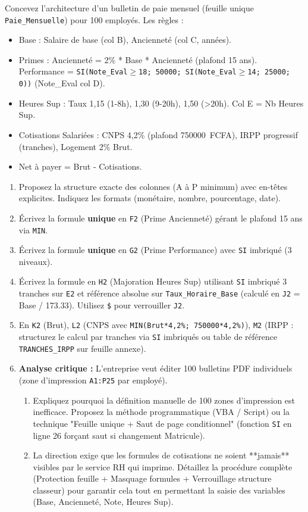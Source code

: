 \documentclass[11pt]{article}
\begin{document}
\begin{exercice}
Concevez l'architecture d'un bulletin de paie mensuel (feuille unique \texttt{Paie\_Mensuelle}) pour 100 employés. Les règles : 
\begin{itemize}
    \item Base : Salaire de base (col B), Ancienneté (col C, années).
    \item Primes : Ancienneté = 2\% * Base * Ancienneté (plafond 15 ans). Performance = \texttt{SI(Note\_Eval$\ge$18; 50000; SI(Note\_Eval$\ge$14; 25000; 0))} (Note\_Eval col D).
    \item Heures Sup : Taux 1,15 (1-8h), 1,30 (9-20h), 1,50 (>20h). Col E = Nb Heures Sup.
    \item Cotisations Salariées : CNPS 4,2\% (plafond \SI{750000}{FCFA}), IRPP progressif (tranches), Logement 2\% Brut.
    \item Net à payer = Brut - Cotisations.
\end{itemize}
\begin{enumerate}
    \item Proposez la structure exacte des colonnes (A à P minimum) avec en-têtes explicites. Indiquez les formats (monétaire, nombre, pourcentage, date).
    \item Écrivez la formule \textbf{unique} en \texttt{F2} (Prime Ancienneté) gérant le plafond 15 ans via \texttt{MIN}.
    \item Écrivez la formule \textbf{unique} en \texttt{G2} (Prime Performance) avec \texttt{SI} imbriqué (3 niveaux).
    \item Écrivez la formule en \texttt{H2} (Majoration Heures Sup) utilisant \texttt{SI} imbriqué 3 tranches sur \texttt{E2} et référence absolue sur \texttt{Taux\_Horaire\_Base} (calculé en \texttt{J2} = Base / 173.33). Utilisez \texttt{\$} pour verrouiller \texttt{J2}.
    \item En \texttt{K2} (Brut), \texttt{L2} (CNPS avec \texttt{MIN(Brut*4,2\%; 750000*4,2\%)}), \texttt{M2} (IRPP : structurez le calcul par tranches via \texttt{SI} imbriqués ou table de référence \texttt{TRANCHES\_IRPP} sur feuille annexe).
    \item \textbf{Analyse critique :} L'entreprise veut éditer 100 bulletins PDF individuels (zone d'impression \texttt{A1:P25} par employé). 
    \begin{enumerate}
        \item Expliquez pourquoi la définition manuelle de 100 zones d'impression est inefficace. Proposez la méthode programmatique (VBA / Script) ou la technique "Feuille unique + Saut de page conditionnel" (fonction \texttt{SI} en ligne 26 forçant saut si changement Matricule).
        \item La direction exige que les formules de cotisations ne soient **jamais** visibles par le service RH qui imprime. Détaillez la procédure complète (Protection feuille + Masquage formules + Verrouillage structure classeur) pour garantir cela tout en permettant la saisie des variables (Base, Ancienneté, Note, Heures Sup).
    \end{enumerate}
\end{enumerate}
\end{exercice}
\end{document}
